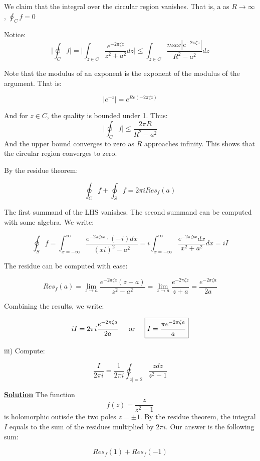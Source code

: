 \documentclass{article}
\newcommand{\new}[1]{
    \vspace{2mm}
    \noindent
    \textbf{
    \underline{#1}}
}
\newcommand{\textOr}{
    {
        \hspace{5mm}
        \textrm{or}
        \hspace{5mm}
    }
}
\begin{document}
We claim that the integral over the circular region vanishes. That is, a
as $R \rightarrow \infty$, $
    \oint_C f = 0
    $

    Notice:
\[
    \bigg|
    \oint_C f
    \bigg|
    = \bigg|
    \int_{z \in C} 
    \frac{e^{-2\pi \zeta z}}{z^2+a^2}
    dz
    \bigg|
    \leq 
    \int_{z \in C} 
    \frac{max|e^{-2\pi \zeta z}|}
    {R^2 - a^2}dz
\]

Note that the modulus of an exponent is the exponent 
of the modulus of the argument. That is:

\[
    |e^{-z}| = e^{Re(-2\pi \zeta z)}
\]

And for $z \in C$, the quality is bounded under 1. 
Thus:
\[
 \bigg|
    \oint_C f
    \bigg|
    \leq 
    \frac{
    2\pi R
    }
    {R^2 - a^2}
\]
And the upper bound converges to zero as $R$ approaches infinity. 
This shows that the circular region converges to zero. 
\checkmark 

By the residue theorem:

\[
    \oint_C f + \oint_S f = 2\pi i Res_f(a)
\]

The first summand of the LHS vanishes. The second summand can 
be computed with some algebra. We write:

\[
\oint_S f = 
    \int_{x = -\infty}^{\infty}
    \frac{
        e^{-2\pi \zeta i x} \cdot (-i)dx
    }{ 
        (xi)^2 - a^2
    }
    = 
    i \int_{x = -\infty}^{\infty}
    \frac{e^{-2\pi \zeta i x} dx} 
    {x^2 + a^2}dx
    = iI
\]

The residue can be computed with ease:

\[
    Res_f(a) = 
    \lim_{z\rightarrow a} 
    \frac{e^{-2\pi \zeta z}(z-a)}{z^2-a^2}
    =
    \lim_{z\rightarrow a} 
    \frac{e^{-2 \pi \zeta z}}{z+a}
    =\frac{e^{-2 \pi \zeta a}}{2a}
\]

Combining the results, we write:

\[
    iI = 2\pi i \frac{e^{-2 \pi \zeta a}}{2a}
    \textOr
    \boxed{
        I = \frac{\pi e^{-2 \pi \zeta a}}{a}
    }
\]
\newpage

iii) Compute:

\[
    \frac{I}{2\pi i} = \frac{1}{2\pi i}
    \oint_{|z| = 2} \frac{zdz}{z^2 - 1}
\]

\new{Solution} The function 
\[
    f(z) = \frac{z}{z^2-1}
\]
is holomorphic outisde the two poles $z = \pm 1$. By the residue 
theorem, the integral $I$ equals to the sum of the residues 
multiplied by $2\pi i$. Our answer is the following sum:

\[
    Res_f(1)+ Res_f(-1)
\]
\end{document}
